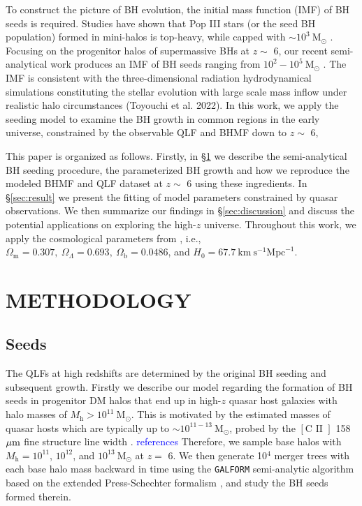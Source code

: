 \documentclass[nolinenumbers,preprint2,tighten]{aastex631}
\newcommand{\Msun}{\mathrm{M_\odot}}
\newcommand{\Mh}{M_\mathrm{h}}
\newcommand{\blue}[1]{\textcolor{blue}{ #1}}
\begin{document}
\begin{CJK*}{UTF8}{gbsn}
To construct the picture of BH evolution, the initial mass function (IMF) of BH seeds is required.
Studies have shown that Pop III stars (or the seed BH population) formed in mini-halos is top-heavy, while capped with $\sim 10^3~\Msun$ 
\citep{2014ApJ...781...60H,2015MNRAS.448..568H}.
Focusing on the progenitor halos of supermassive BHs at $z\sim$ 6, 
our recent semi-analytical work produces an IMF of BH seeds ranging from $10^2-10^5~\Msun$ \citep{2021ApJ...917...60L}. 
The IMF is consistent with the three-dimensional radiation hydrodynamical simulations 
constituting the stellar evolution with large scale mass inflow under realistic halo circumstances (Toyouchi et al. 2022).
In this work, we apply the seeding model to examine the BH growth in common regions in the early universe, 
constrained by the observable QLF and BHMF down to $z\sim$ 6, 

This paper is organized as follows. Firstly, in \S \ref{sec:method} we describe the semi-analytical BH seeding procedure, 
the parameterized BH growth and how we reproduce the modeled BHMF and QLF dataset at $z\sim$ 6 using these ingredients. 
In \S \ref{sec:result} we present the fitting of model parameters constrained by quasar observations. 
We then summarize our findings in \S \ref{sec:discussion} and discuss the potential applications on exploring the high-$z$ universe.
Throughout this work, we apply the cosmological parameters from \cite{2016A&A...594A..13P},
i.e., $\Omega_{\mathrm{m}}=0.307,~\Omega_{\Lambda}=0.693,~
\Omega_{\mathrm{b}}=0.0486$, and $H_0=67.7 \mathrm{~km} \mathrm{~s}^{-1} \mathrm{Mpc}^{-1}$.

\vspace{5mm}
\section{METHODOLOGY}\label{sec:method}

\vspace{2mm}
\subsection{Seeds}\label{sec:seed}
The QLFs at high redshifts are determined by the original BH seeding and subsequent growth. 
Firstly we describe our model regarding the formation of BH seeds in progenitor DM halos 
that end up in high-$z$ quasar host galaxies with halo masses of $\Mh>10^{11}~\Msun$.
This is motivated by the estimated masses of quasar hosts which are typically up to $\sim 10^{11-13}~\Msun$, 
probed by the $\left[\mathrm{C} \text{ II }\right]$ 158 $\mbox{$\mu$m}$ fine structure line width \citep{2019ApJ...872L..29S}.
\blue{references}
Therefore, we sample base halos with $\Mh = 10^{11}$, $10^{12}$, and $10^{13} ~\Msun$ at $z=$ 6. 
We then generate 10$^4$ merger trees with each base halo mass backward in time using the {\tt GALFORM} 
semi-analytic algorithm based on the extended Press-Schechter formalism 
\citep{1974ApJ...187..425P,2000MNRAS.319..168C,2008MNRAS.383..557P}, and study the BH seeds formed therein.


\end{CJK*}
\end{document}
